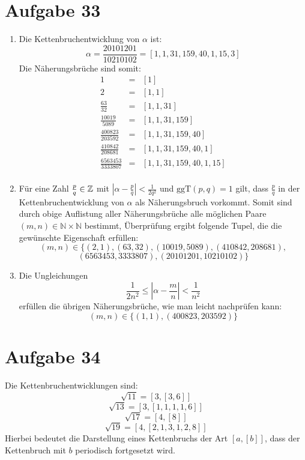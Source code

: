 \section*{Aufgabe 33}
\begin{enumerate}[(1)]
	\item Die Kettenbruchentwicklung von $\alpha$ ist:
	\[ \alpha = \frac{20101201}{10210102} = [ 1, 1, 31, 159, 40, 1, 15, 3 ] \]
	Die Näherungsbrüche sind somit:
	\begin{eqnarray*}
	1 &=& [1] \\
	2 &=& [1, 1] \\
	\frac{63}{32} &=& [1,1,31] \\
	\frac{10019 }{5089} &=& [1,1,31,159] \\
	\frac{400823}{203592} &=& [1,1,31,159,40] \\
	\frac{410842}{208681} &=& [1,1,31,159,40,1] \\
	\frac{6563453}{3333807} &=& [1,1,31,159,40,1,15] \\
	\end{eqnarray*}
		
	\item Für eine Zahl $\frac{p}{q} \in \mathbb{Z}$ mit $\left| \alpha -
	\frac{p}{q} \right| < \frac{1}{2 q^2}$ und $\text{ggT}(p,q) = 1$ gilt, dass
	$\frac{p}{q}$ in der Kettenbruchentwicklung von $\alpha$ als
	Näherungsbruch vorkommt.
	Somit sind durch obige Auflistung aller Näherungsbrüche alle möglichen Paare $(m,n) \in \mathbb{N} \times \mathbb{N}$ bestimmt, Überprüfung ergibt folgende Tupel, die die gewünschte Eigenschaft erfüllen:
	\[ (m,n) \in \{ (2,1), (63,32), (10019, 5089), (410842 ,208681 ), \]
	\[ (6563453 ,3333807 ), (20101201 ,10210102 )\} \]

	\item Die Ungleichungen 
	\[ \frac{1}{2 n^2} \leq \left| \alpha - \frac{m}{n} \right| < \frac{1}{n^2} \]
	erfüllen die übrigen Näherungsbrüche, wie man leicht nachprüfen kann:
	\[ (m,n) \in \{(1,1), (400823, 203592)\} \]
\end{enumerate}


\section*{Aufgabe 34}
Die Kettenbruchentwicklungen sind:
\[ \sqrt{11} = [3, [3, 6]] \]
\[ \sqrt{13} = [3, [1, 1, 1, 1, 6]] \]
\[ \sqrt{17} = [4, [8]] \]
\[ \sqrt{19} = [4, [2, 1, 3, 1, 2, 8]] \]
Hierbei bedeutet die Darstellung eines Kettenbruchs der Art $[a, [b]]$, dass
der Kettenbruch mit $b$ periodisch fortgesetzt wird.

